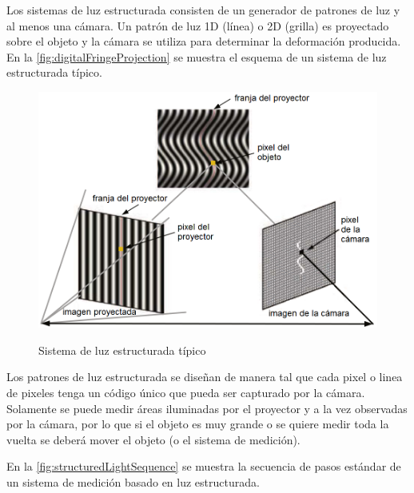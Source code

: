 Los sistemas de luz estructurada consisten de un generador de patrones de luz y al menos una cámara. Un patrón de luz 1D (línea) o 2D (grilla) es proyectado sobre el objeto y la cámara se utiliza para determinar la deformación producida. En la \autoref{fig:digitalFringeProjection} se muestra el esquema de un sistema de luz estructurada típico.


\begin{figure}[bth]
    \myfloatalign
        {\includegraphics[width=1.0\linewidth]{images/digitalFringeProjection}}
        \caption{Sistema de luz estructurada típico}
        \label{fig:digitalFringeProjection}
\end{figure}

Los patrones de luz estructurada se diseñan de manera tal que cada pixel o linea de pixeles tenga un código único que pueda ser capturado por la cámara. Solamente se puede medir áreas iluminadas por el proyector y a la vez observadas por la cámara, por lo que si el objeto es muy grande o se quiere medir toda la vuelta se deberá mover el objeto (o el sistema de medición).

En la \autoref{fig:structuredLightSequence} se muestra la secuencia de pasos estándar de un sistema de medición basado en luz estructurada.


